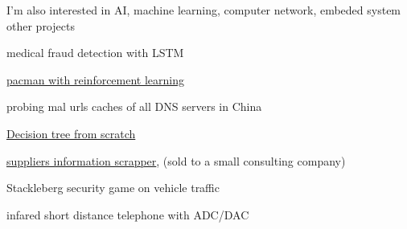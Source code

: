 \begin{cventries}
  \cventry
    {I'm also interested in AI, machine learning, computer network, embeded system} %
    {other projects} %
    { } %
    { } %
    {
      \begin{cvitems} %
        \item {medical fraud detection with LSTM}
        \item {\href{https://github.com/yihui-he/AI-CS_188}{pacman with reinforcement learning}}
        \item {probing  mal urls caches of all DNS servers in China\href{https://github.com/yihui-he/DNS_query_Cpp}{}}
	\item {\href{https://github.com/yihui-he/Decision-tree}{Decision tree from scratch}}
        \item {\href{https://github.com/yihui-he/Alibaba-supplier-info-Scrapper}{suppliers information scrapper}, (sold to a small consulting company)}
        \item {Stackleberg security game on vehicle traffic}
        \item {infared short distance telephone with ADC/DAC}
      \end{cvitems}
    }

\end{cventries}
